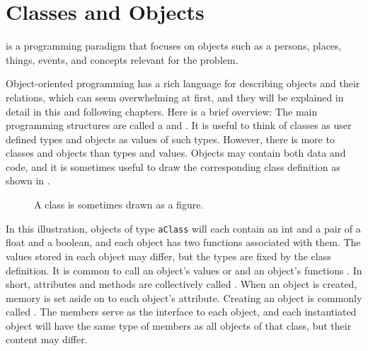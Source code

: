 \chapter{Classes and Objects}
\label{chap:oop}

 is a programming paradigm that focuses on objects such as a persons, places, things, events, and concepts relevant for the problem.

Object-oriented programming has a rich language for describing objects and their relations, which can seem overwhelming at first, and they will be explained in detail in this and following chapters. Here is a brief overview: The main programming structures are called a  and . It is useful to think of classes as user defined types and objects as values of such types. However, there is more to classes and objects than types and values. Objects may contain both data and code, and it is sometimes useful to draw the corresponding class definition as shown in .
\begin{figure}[h]
  \centering
  \caption{A class is sometimes drawn as a figure.}
  \label{fig:aClass}
\end{figure}
In this illustration, objects of type \lstinline{aClass} will each contain an int and a pair of a float and a boolean, and each object has two functions associated with them. The values stored in each object may differ, but the types are fixed by the class definition. It is common to call an object's values  or  and an object's functions . In short, attributes and methods are collectively called . When an object is created, memory is set aside on  to each object's attribute. Creating an object is commonly called . The members serve as the interface to each object, and each instantiated object will have the same type of members as all objects of that class, but their content may differ.

